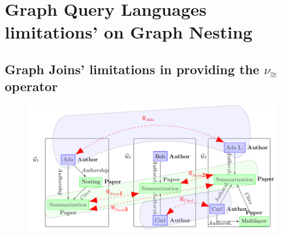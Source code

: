 \section{Graph Query Languages limitations’ on Graph Nesting}
\subsection{Graph Joins' limitations in providing the $\nu_\cong$ operator}\label{sec:whynotjoins}
\begin{figure}[!b]

\end{figure}

\begin{figure}
	\begin{minipage}{\textwidth}
\centering
\includegraphics[width=\textwidth]{fig/06nesting/01_example}
\label{fig:homog}
	\end{minipage}
	\begin{minipage}{\textwidth}


\end{minipage}
\end{figure}
